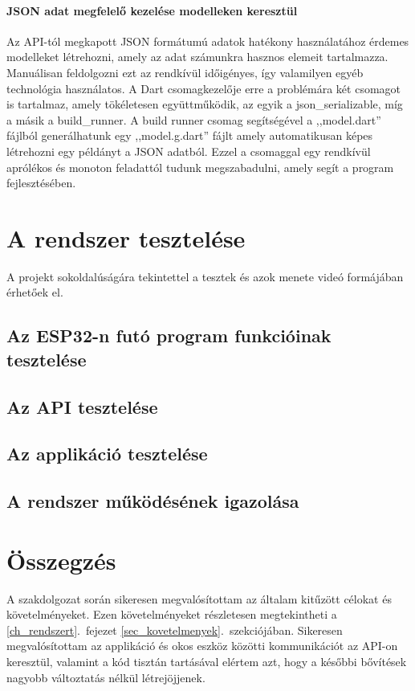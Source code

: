 \documentclass{thesis-ekf}
\theoremstyle{definition}
\theoremstyle{remark}
\begin{document}
	\subsubsection{JSON adat megfelelő kezelése modelleken keresztül}
	Az API-tól megkapott JSON formátumú adatok hatékony használatához érdemes modelleket létrehozni, amely az adat számunkra hasznos elemeit tartalmazza. Manuálisan feldolgozni ezt az rendkívül időigényes, így valamilyen egyéb technológia használatos. A Dart csomagkezelője erre a problémára két csomagot is tartalmaz, amely tökéletesen együttműködik, az egyik a json\_serializable\cite{bib_flutter_json_ser}, míg a másik a build\_runner\cite{bib_flutter_runner}. A build runner csomag segítségével a ,,model.dart'' fájlból generálhatunk egy ,,model.g.dart'' fájlt amely automatikusan képes létrehozni egy példányt a JSON adatból. Ezzel a csomaggal egy rendkívül aprólékos és monoton feladattól tudunk megszabadulni, amely segít a program fejlesztésében.
	 
	\chapter{A rendszer tesztelése}
	A projekt sokoldalúságára tekintettel a tesztek és azok menete videó formájában érhetőek el.
	\section{Az ESP32-n futó program funkcióinak tesztelése}
	\section{Az API tesztelése}
	\section{Az applikáció tesztelése}
	\section{A rendszer működésének igazolása}
	\chapter*{Összegzés}
	A szakdolgozat során sikeresen megvalósítottam az általam kitűzött célokat és követelményeket. Ezen követelményeket részletesen megtekintheti a \ref{ch_rendszert}.~fejezet \ref{sec_kovetelmenyek}.~szekciójában. Sikeresen megvalósítottam az applikáció és okos eszköz közötti kommunikációt az API-on keresztül, valamint a kód tisztán tartásával elértem azt, hogy a későbbi bővítések nagyobb változtatás nélkül létrejöjjenek.
\end{document}
